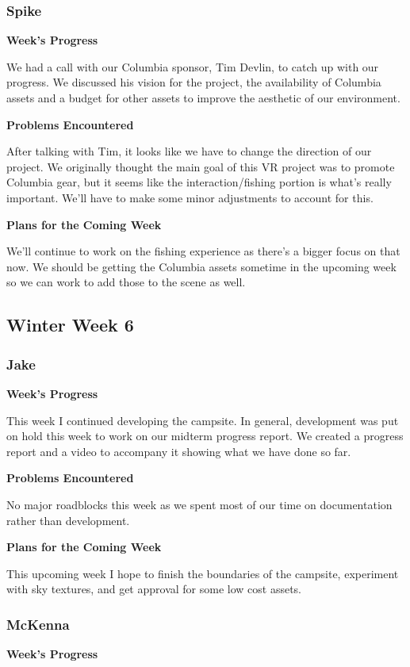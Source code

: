 \documentclass[10pt,journal,compsoc,onecolumn, draftclsnofoot]{IEEEtran}
\begin{document}
\subsubsection{Spike}
\noindent \textbf{Week's Progress}

We had a call with our Columbia sponsor, Tim Devlin, to catch up with our progress. We discussed his vision for the project, the availability of Columbia assets and a budget for other assets to improve the aesthetic of our environment.

\noindent \textbf{Problems Encountered}

After talking with Tim, it looks like we have to change the direction of our project. We originally thought the main goal of this VR project was to promote Columbia gear, but it seems like the interaction/fishing portion is what's really important. We'll have to make some minor adjustments to account for this.

\noindent \textbf{Plans for the Coming Week}

We'll continue to work on the fishing experience as there's a bigger focus on that now. We should be getting the Columbia assets sometime in the upcoming week so we can work to add those to the scene as well.

\subsection{Winter Week 6}
\subsubsection{Jake}
\noindent \textbf{Week's Progress}

This week I continued developing the campsite. In general, development was put on hold this week to work on our midterm progress report. We created a progress report and a video to accompany it showing what we have done so far.

\noindent \textbf{Problems Encountered}

No major roadblocks this week as we spent most of our time on documentation rather than development.

\noindent \textbf{Plans for the Coming Week}

This upcoming week I hope to finish the boundaries of the campsite, experiment with sky textures, and get approval for some low cost assets.

\subsubsection{McKenna}
\noindent \textbf{Week's Progress}
\end{document}
